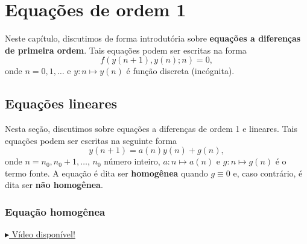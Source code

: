 
\chapter{Equações de ordem 1}\label{cap_ead1}

Neste capítulo, discutimos de forma introdutória sobre {\bf equações a diferenças de primeira ordem}. Tais equações podem ser escritas na forma
\begin{equation}
  f\left(y(n+1),y(n);n\right)=0,
\end{equation}
onde $n=0, 1, \ldots$ e $y:n\mapsto y(n)$ é função discreta (incógnita).

\section{Equações lineares}\label{cap_ead1_sec_eqlin}

Nesta seção, discutimos sobre equações a diferenças de ordem 1 e lineares. Tais equações podem ser escritas na seguinte forma
\begin{equation}
  y(n+1) = a(n)y(n) + g(n),
\end{equation}
onde $n=n_0, n_0+1, \ldots$, $n_0$ número inteiro, $a:n\mapsto a(n)$ e $g:n\mapsto g(n)$ é o termo fonte. A equação é dita ser {\bf homogênea} quando $g\equiv 0$ e, caso contrário, é dita ser {\bf não homogênea}.

\subsection{Equação homogênea}

\begin{flushright}
  \href{https://archive.org/details/ead-o1h}{$\blacktriangleright$ Vídeo disponível!}
\end{flushright}

